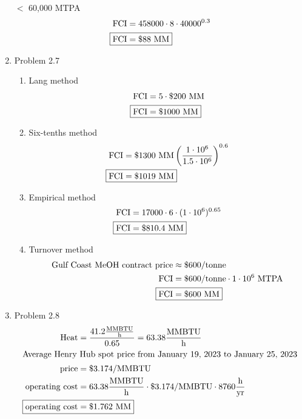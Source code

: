 \documentclass[12pt]{article}
\begin{document}
\begin{enumerate}
    $<$ 60,000 MTPA
    \begin{align*}
        \mathrm{FCI} &= 458000 \cdot 8 \cdot 40000^{0.3} \\
        \Aboxed{\mathrm{FCI} &= \$ 88 \text{ MM}}
    \end{align*}

\newpage
    \item Problem 2.7
    \begin{enumerate}
        \item Lang method
        \begin{align*}
            \mathrm{FCI} &= 5 \cdot \$ 200 \text{ MM} \\
            \Aboxed{\mathrm{FCI} &= \$ 1000 \text{ MM}}
        \end{align*}

        \item Six-tenths method
        \begin{align*}
            \mathrm{FCI} &= \$ 1300 \text{ MM} \left( \frac{1 \cdot 10^6}{1.5 \cdot 10^6} \right)^{0.6} \\
            \Aboxed{\mathrm{FCI} &= \$ 1019 \text{ MM}}
        \end{align*}

        \item Empirical method 
        \begin{align*}
            \mathrm{FCI} &= 17000 \cdot 6 \cdot (1 \cdot 10^6)^{0.65} \\
            \Aboxed{\mathrm{FCI} &= \$ 810.4 \text{ MM}}
        \end{align*}

        \item Turnover method
        \begin{align*}
            \text{Gulf Coast MeOH contract price} &\approx \$ 600 / \mathrm{tonne} \\
            \mathrm{FCI} &= \$ 600 / \mathrm{tonne} \cdot 1 \cdot 10^6 \text{ MTPA} \\
            \Aboxed{\mathrm{FCI} &= \$ 600 \text{ MM}}
        \end{align*}
    \end{enumerate}


\newpage
    \item Problem 2.8
    \begin{align*}
        \text{Heat} &= \frac{41.2 \frac{\mathrm{MMBTU}}{\mathrm{h}}}{0.65} = 63.38 \frac{\mathrm{MMBTU}}{\mathrm{h}} \\
        \intertext{Average Henry Hub spot price from January 19, 2023 to January 25, 2023}
        \mathrm{price} &= \$ 3.174 / \mathrm{MMBTU} \\
        \text{operating cost} &= 63.38 \frac{\mathrm{MMBTU}}{\mathrm{h}} \cdot \$ 3.174 / \mathrm{MMBTU} \cdot 8760 \frac{\mathrm{h}}{\mathrm{yr}} \\
        \Aboxed{\text{operating cost} &= \$ 1.762 \text{ MM}}
    \end{align*}


\end{enumerate}
\end{document}
